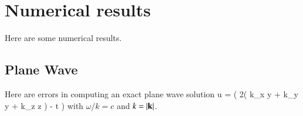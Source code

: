 \section{Numerical results} \label{sec:numericalResults}

Here are some numerical results. 


\subsection{Plane Wave}


Here are errors in computing an exact plane wave solution
\bas
    u = \sin( 2\pi ( k_x y + k_y y + k_z z ) - \omega t )
\eas
with $\omega/k=c$ and $k=|\mathbf{ k}|$. 

